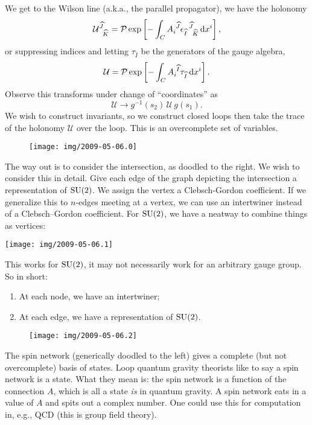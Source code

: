 We get to the Wilson line (a.k.a., the parallel propagator), we have the
holonomy
\begin{equation}
\mathcal{U}^{\widehat{J}}_{\phantom{J}\widehat{K}}
  = \mathcal{P}\exp\left[-\int_{C}A_{i}^{\phantom{i}\widehat{J}}{{\epsilon_{\widehat{I}}}^{\,\widehat{J}}}_{\!\widehat{K}}\, \mathrm{d} x^{i}\right],
\end{equation}
or suppressing indices and letting $\tau_{\widehat{I}}$ be the
generators of the gauge algebra,
\begin{equation}
\mathcal{U}
= \mathcal{P}\exp\left[-\int_{C}A_{i}^{\phantom{i}\widehat{I}}\tau_{\widehat{I}}\, \mathrm{d} x^{i}\right].
\end{equation}
Observe this transforms under change of ``coordinates'' as
\begin{equation}
\mathcal{U}\to g^{-1}(s_{2})\,\mathcal{U}\, g(s_{1}).
\end{equation}
We wish to construct invariants, so we construct closed loops then take
the trace of the holonomy $\mathcal{U}$ over the loop. This is an
overcomplete set of variables.

\begin{wrapfigure}{R}{7pc}
\centering\vskip-1pc
\texttt{[image: img/2009-05-06.0]}
\end{wrapfigure}
The way out is to consider the intersection, as doodled to the right.
We wish to consider this in detail. Give each edge of the graph
depicting the intersection a representation of $\operatorname{SU}(2)$.
We assign the vertex a Clebsch-Gordon coefficient. If we generalize this
to $n$-edges meeting at a vertex, we can use an intertwiner instead of a
Clebsch--Gordon coefficient. For $\operatorname{SU}(2)$, we have a neatway to combine
things as vertices:
\begin{center}
  \texttt{[image: img/2009-05-06.1]}
\end{center}
This works for $\operatorname{SU}(2)$, it may not necessarily work for an arbitrary
gauge group. So in short:
\begin{enumerate}
\item At each node, we have an intertwiner;
\item At each edge, we have a representation of $\operatorname{SU}(2)$.
\end{enumerate}

\begin{wrapfigure}{l}{8pc}
\centering %
\texttt{[image: img/2009-05-06.2]}
\end{wrapfigure}
The spin network (generically doodled to the left) gives a complete (but
not overcomplete) basis of states. Loop quantum gravity theorists like
to say a spin network is a state. What they mean is: the spin network is
a function of the connection $A$, which is all a state \emph{is} in
quantum gravity. A spin network eats in a value of $A$ and spits out a
complex number. One could use this for computation in, e.g., QCD (this
is group field theory).

